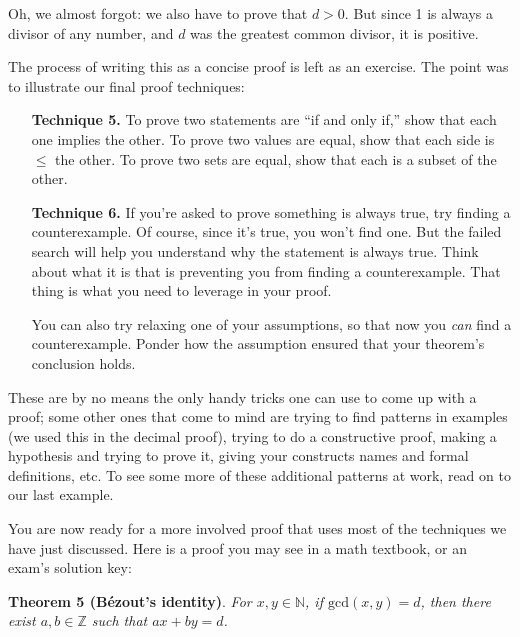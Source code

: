 \documentclass[11pt]{article}
\begin{document}
    Oh, we almost forgot: we also have to prove that $d>0$. But since 1 is always a divisor of any number, and $d$ was the greatest common divisor, it is positive.
    
    The process of writing this as a concise proof is left as an exercise. The point was
    to illustrate our final proof techniques:

    \begin{enumerate}
        \item[\textbf{Technique 5.}]
        To prove two statements are ``if and only if,'' show that each one implies 
        the other. To prove two values are equal, show that each side is $\leq$ the
        other. To prove two sets are equal, show that each is a subset of the other.
        
        \item[\textbf{Technique 6.}]
        If you're asked to prove something is always true, try finding a counterexample.
        Of course, since it's true, you won't find one. But the failed search will help
        you understand why the statement is always true. Think about what it is that is
        preventing you from finding a counterexample. That thing is what you need to
        leverage in your proof.
        
        You can also try relaxing one of your assumptions, so that now you \textit{can}
        find a counterexample. Ponder how the assumption ensured that your theorem's
        conclusion holds.
        
    \end{enumerate}
    
    These are by no means the only handy tricks one can use to come up with a proof;
    some other ones that come to mind are trying to find patterns in examples (we used
    this in the decimal proof), trying to do a constructive proof, making a hypothesis
    and trying to prove it, giving your constructs names and formal definitions, etc.
    To see some more of these additional patterns at work, read on to our last example.
    

    You are now ready for a more involved proof that uses most of the techniques we
    have just discussed. Here is a proof you may see in a math textbook, or an exam's
    solution key:
    
    \textbf{Theorem 5 (Bézout's identity)}. \textit{For $x,y\in\mathbb{N}$, if
    $\mathrm{gcd}(x,y)=d$, then there exist $a,b\in\mathbb{Z}$ such that $ax+by=d$.}
    
\end{document}
